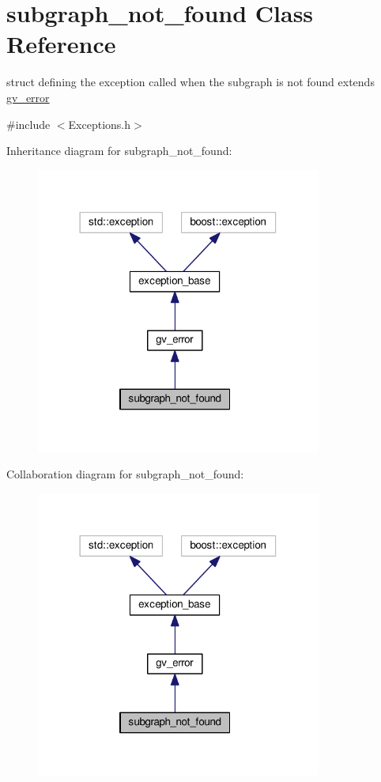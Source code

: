 \hypertarget{structsubgraph__not__found}{\section{subgraph\+\_\+not\+\_\+found Class Reference}
\label{structsubgraph__not__found}
}


struct defining the exception called when the subgraph is not found extends \hyperlink{structgv__error}{gv\+\_\+error}  




{\ttfamily \#include $<$Exceptions.\+h$>$}



Inheritance diagram for subgraph\+\_\+not\+\_\+found\+:\nopagebreak
\begin{figure}[H]
\begin{center}
\leavevmode
\includegraphics[width=266pt]{structsubgraph__not__found__inherit__graph}
\end{center}
\end{figure}


Collaboration diagram for subgraph\+\_\+not\+\_\+found\+:\nopagebreak
\begin{figure}[H]
\begin{center}
\leavevmode
\includegraphics[width=266pt]{structsubgraph__not__found__coll__graph}
\end{center}
\end{figure}


